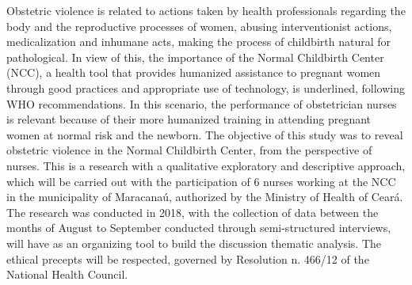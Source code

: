 Obstetric violence is related to actions taken by health professionals regarding the body and the reproductive processes of women, abusing interventionist actions, medicalization and inhumane acts, making the process of childbirth natural for pathological. In view of this, the importance of the Normal Childbirth Center (NCC), a health tool that provides humanized assistance to pregnant women through good practices and appropriate use of technology, is underlined, following WHO recommendations. In this scenario, the performance of obstetrician nurses is relevant because of their more humanized training in attending pregnant women at normal risk and the newborn. The objective of this study was to reveal obstetric violence in the Normal Childbirth Center, from the perspective of nurses. This is a research with a qualitative exploratory and descriptive approach, which will be carried out with the participation of 6 nurses working at the NCC in the municipality of Maracanaú, authorized by the Ministry of Health of Ceará. The research was conducted in 2018, with the collection of data between the months of August to September conducted through semi-structured interviews, will have as an organizing tool to build the discussion thematic analysis. The ethical precepts will be respected, governed by Resolution n. 466/12 of the National Health Council.

